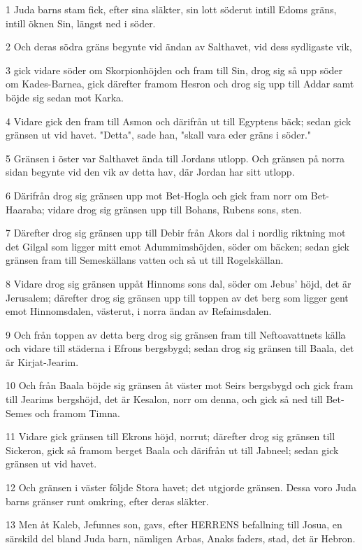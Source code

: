 \par 1 Juda barns stam fick, efter sina släkter, sin lott söderut intill Edoms gräns, intill öknen Sin, längst ned i söder.
\par 2 Och deras södra gräns begynte vid ändan av Salthavet, vid dess sydligaste vik,
\par 3 gick vidare söder om Skorpionhöjden och fram till Sin, drog sig så upp söder om Kades-Barnea, gick därefter framom Hesron och drog sig upp till Addar samt böjde sig sedan mot Karka.
\par 4 Vidare gick den fram till Asmon och därifrån ut till Egyptens bäck; sedan gick gränsen ut vid havet. "Detta", sade han, "skall vara eder gräns i söder."
\par 5 Gränsen i öster var Salthavet ända till Jordans utlopp. Och gränsen på norra sidan begynte vid den vik av detta hav, där Jordan har sitt utlopp.
\par 6 Därifrån drog sig gränsen upp mot Bet-Hogla och gick fram norr om Bet-Haaraba; vidare drog sig gränsen upp till Bohans, Rubens sons, sten.
\par 7 Därefter drog sig gränsen upp till Debir från Akors dal i nordlig riktning mot det Gilgal som ligger mitt emot Adummimshöjden, söder om bäcken; sedan gick gränsen fram till Semeskällans vatten och så ut till Rogelskällan.
\par 8 Vidare drog sig gränsen uppåt Hinnoms sons dal, söder om Jebus' höjd, det är Jerusalem; därefter drog sig gränsen upp till toppen av det berg som ligger gent emot Hinnomsdalen, västerut, i norra ändan av Refaimsdalen.
\par 9 Och från toppen av detta berg drog sig gränsen fram till Neftoavattnets källa och vidare till städerna i Efrons bergsbygd; sedan drog sig gränsen till Baala, det är Kirjat-Jearim.
\par 10 Och från Baala böjde sig gränsen åt väster mot Seirs bergsbygd och gick fram till Jearims bergshöjd, det är Kesalon, norr om denna, och gick så ned till Bet-Semes och framom Timna.
\par 11 Vidare gick gränsen till Ekrons höjd, norrut; därefter drog sig gränsen till Sickeron, gick så framom berget Baala och därifrån ut till Jabneel; sedan gick gränsen ut vid havet.
\par 12 Och gränsen i väster följde Stora havet; det utgjorde gränsen. Dessa voro Juda barns gränser runt omkring, efter deras släkter.
\par 13 Men åt Kaleb, Jefunnes son, gavs, efter HERRENS befallning till Josua, en särskild del bland Juda barn, nämligen Arbas, Anaks faders, stad, det är Hebron.
